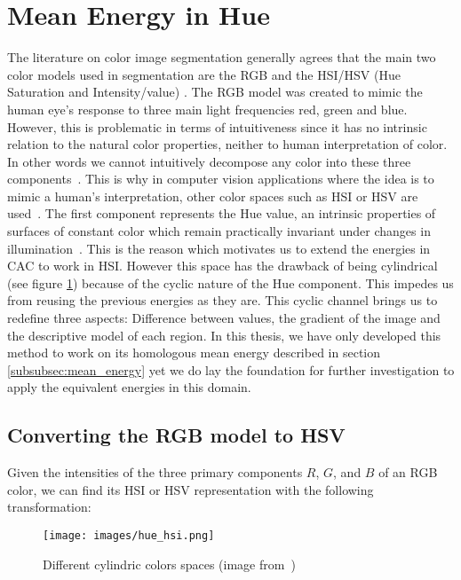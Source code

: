 %

\section{Mean Energy in Hue}
\label{subsec:hue_energy}

The literature on color image segmentation generally agrees that the main two color models used in segmentation are the RGB and the HSI/HSV (Hue Saturation and Intensity/value) \cite{ChienHSI,Cheng01colorimage}. The RGB model was created to mimic the human eye's response to three main light frequencies red, green and blue. However, this is problematic in terms of intuitiveness since it has no intrinsic relation to the natural color properties, neither to human interpretation of color. In other words we cannot intuitively decompose any color into these three components~\cite{Lucchese_colorimage}. This is why in computer vision applications where the idea is to mimic a human's interpretation, other color spaces such as HSI or HSV are used~\cite{Huntsherger1985131}. The first component represents the Hue value, an intrinsic properties of surfaces of constant color which remain practically invariant under changes in illumination~\cite{Kohtaro200}. This is the reason which motivates us to extend the energies in CAC to work in HSI. However this space has the drawback of being cylindrical (see figure \ref{fig:hue_hsi}) because of the cyclic nature of the Hue component. This impedes us from reusing the previous energies as they are. This cyclic channel brings us to redefine three aspects: Difference between values, the gradient of the image and the descriptive model of each region. In this thesis, we have only developed this method to work on its homologous mean energy described in section \ref{subsubsec:mean_energy} yet we do lay the foundation for further investigation to apply the equivalent energies in this domain.

\subsection{Converting the RGB model to HSV}
\label{subsubsec:rgb_to_hsv}


Given the intensities of the three primary components $R$, $G$, and $B$ of an RGB color, we can find its HSI or HSV representation with the following transformation:
\begin{figure}[h]
	\centering
	{\texttt{[image: images/hue\_hsi.png]}}
	\caption{Different cylindric colors spaces (image from~\cite{WinNT})}
	\label{fig:hue_hsi}
\end{figure}

